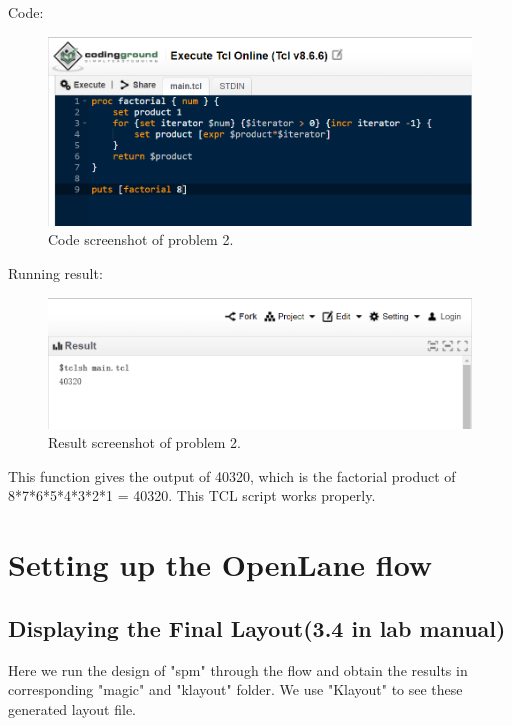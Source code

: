 \documentclass[a4paper]{article}
\begin{document}
Code: 
\begin{figure}[H]
    \centering
    \includegraphics[width=1\textwidth]{part2_2_code.png}
    \caption{Code screenshot of problem 2.}
\end{figure}
Running result:
\begin{figure}[H]
    \centering
    \includegraphics[width=1\textwidth]{part2_2_result.png}
    \caption{Result screenshot of problem 2.}
\end{figure}
This function gives the output of 40320, which is the factorial product of 8*7*6*5*4*3*2*1 = 40320. This TCL script works properly.

\section{Setting up the OpenLane flow}
\subsection{Displaying the Final Layout(3.4 in lab manual)}
Here we run the design of "spm" through the flow and obtain the results in corresponding "magic" and "klayout" folder. We use "Klayout" to see these generated layout file.
\end{document}
